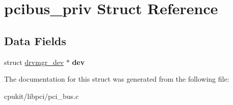 \hypertarget{structpcibus__priv}{}\section{pcibus\+\_\+priv Struct Reference}
\label{structpcibus__priv}
\subsection*{Data Fields}
\begin{DoxyCompactItemize}
\item 
\mbox{\label{structpcibus__priv_a1b755d380a5051fc10c9c13057ef16bc}} 
struct \mbox{\hyperlink{structdrvmgr__dev}{drvmgr\+\_\+dev}} $\ast$ {\bfseries dev}
\end{DoxyCompactItemize}


The documentation for this struct was generated from the following file\+:\begin{DoxyCompactItemize}
\item 
cpukit/libpci/pci\+\_\+bus.\+c\end{DoxyCompactItemize}

